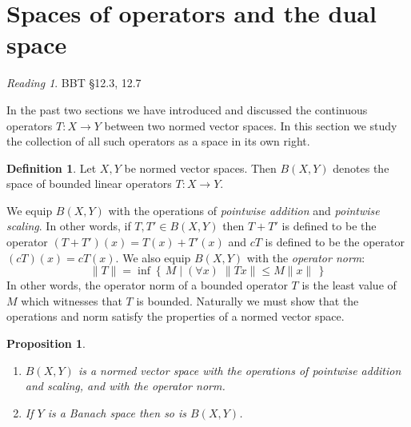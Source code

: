 \documentclass[11pt,oneside]{amsbook}
\newcommand{\set}[1]{\left\{\,#1\,\right\}}
\theoremstyle{definition}
\theoremstyle{plain}
\newtheorem{prop}[thm]{Proposition}
\theoremstyle{definition}
\newtheorem{defn}[thm]{Definition}
\theoremstyle{remark}
\newtheorem*{reading}{Reading}
\numberwithin{equation}{section}
\numberwithin{figure}{section}
\begin{document}
\section{Spaces of operators and the dual space}

\begin{reading}
  BBT \S 12.3, 12.7
\end{reading}

In the past two sections we have introduced and discussed the continuous operators $T\colon X\to Y$ between two normed vector spaces. In this section we study the collection of all such operators as a space in its own right.

\begin{defn}
  Let $X,Y$ be normed vector spaces. Then $B(X,Y)$ denotes the space of bounded linear operators $T\colon X\to Y$.
\end{defn}

We equip $B(X,Y)$ with the operations of \emph{pointwise addition} and \emph{pointwise scaling}. In other words, if $T,T'\in B(X,Y)$ then $T+T'$ is defined to be the operator $(T+T')(x)=T(x)+T'(x)$ and $cT$ is defined to be the operator $(cT)(x)=cT(x)$. We also equip $B(X,Y)$ with the \emph{operator norm}:
\[\|T\|=\inf\set{M\mid(\forall x)\;\|Tx\|\leq M\|x\|}
\]
In other words, the operator norm of a bounded operator $T$ is the least value of $M$ which witnesses that $T$ is bounded. Naturally we must show that the operations and norm satisfy the properties of a normed vector space.

\begin{prop}
  \begin{enumerate}
  \item $B(X,Y)$ is a normed vector space with the operations of pointwise addition and scaling, and with the operator norm.
  \item If $Y$ is a Banach space then so is $B(X,Y)$.
  \end{enumerate}
\end{prop}
\end{document}
